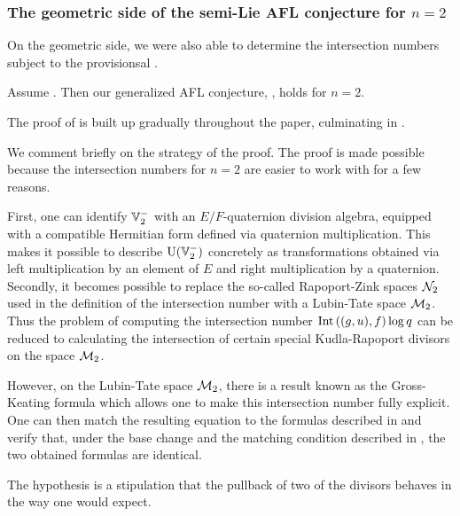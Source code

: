 \subsubsection{The geometric side of the semi-Lie AFL conjecture for $n=2$}
On the geometric side, we were also able to determine the intersection numbers
subject to the provisionsal .
\begin{theorem}
  [Semi-Lie AFL for $n=2$]
  \label{thm:semi_lie_n_equals_2}
  Assume .
  Then our generalized AFL conjecture, , holds for $n = 2$.
\end{theorem}
The proof of  is built up gradually
throughout the paper, culminating in .

We comment briefly on the strategy of the proof.
The proof is made possible because the intersection numbers for $n=2$
are easier to work with for a few reasons.
\begin{itemize}
\ii First, one can identify $\mathbb V_2^-$ with an $E/F$-quaternion division algebra,
equipped with a compatible Hermitian form defined via quaternion multiplication.
This makes it possible to describe $\operatorname{U}(\mathbb V_2^-)$ concretely as transformations obtained
via left multiplication by an element of $E$ and right multiplication by a quaternion.
\ii Secondly, it becomes possible to replace the so-called Rapoport-Zink spaces $\mathcal N_2$
used in the definition of the intersection number with a Lubin-Tate space $\mathcal M_2$.
Thus the problem of computing the intersection number
$\operatorname{Int}\left( (g,u), f \right) \log q$
can be reduced to calculating the intersection of certain special
Kudla-Rapoport divisors on the space $\mathcal M_2$.

However, on the Lubin-Tate space $\mathcal M_2$,
there is a result known as the Gross-Keating formula \cite{ref:GK}
which allows one to make this intersection number fully explicit.
One can then match the resulting equation to the formulas described in
and verify that, under the base change 
and the matching condition described in ,
the two obtained formulas are identical.
\end{itemize}
The hypothesis 
is a stipulation that the pullback of two of the divisors
behaves in the way one would expect.

